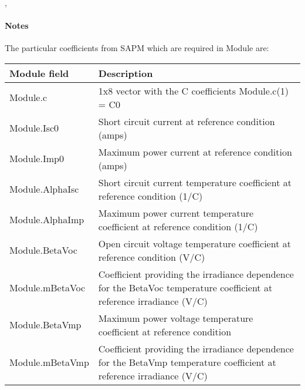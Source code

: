 \documentclass[letterpaper,10pt,english]{sphinxmanual}
\begin{document}
\begin{fulllineitems}
\begin{quote}
\begin{description}
\begin{quote}
\begin{itemize}
\end{itemize}
\end{quote}

\end{description}\end{quote}




, {\hyperref[stubs/pvlib.pvl_sapmcelltemp:pvlib.pvl_sapmcelltemp]{}}


\paragraph{Notes}

The particular coefficients from SAPM which are required in Module
are:

\begin{tabulary}{\linewidth}{|L|L|}
\hline
\textsf{\relax 
Module field
} & \textsf{\relax 
Description
}\\
\hline
Module.c
 & 
1x8 vector with the C coefficients Module.c(1) = C0
\\

Module.Isc0
 & 
Short circuit current at reference condition (amps)
\\

Module.Imp0
 & 
Maximum power current at reference condition (amps)
\\

Module.AlphaIsc
 & 
Short circuit current temperature coefficient at reference condition (1/C)
\\

Module.AlphaImp
 & 
Maximum power current temperature coefficient at reference condition (1/C)
\\

Module.BetaVoc
 & 
Open circuit voltage temperature coefficient at reference condition (V/C)
\\

Module.mBetaVoc
 & 
Coefficient providing the irradiance dependence for the BetaVoc temperature coefficient at reference irradiance (V/C)
\\

Module.BetaVmp
 & 
Maximum power voltage temperature coefficient at reference condition
\\

Module.mBetaVmp
 & 
Coefficient providing the irradiance dependence for the BetaVmp temperature coefficient at reference irradiance (V/C)
\\


\end{tabulary}
\end{fulllineitems}
\end{document}
